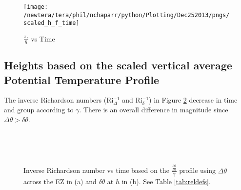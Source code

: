 
\begin{figure}[htbp]
    \centering
    \texttt{[image: /newtera/tera/phil/nchaparr/python/Plotting/Dec252013/pngs/scaled\_h\_f\_time]}
    \caption{$\frac{z_{f}}{h}$ vs Time}
    \label{fig:zfvstime}   %
\end{figure}

\clearpage

\subsection{Heights based on the scaled vertical average Potential Temperature Profile}
\label{subsec:thetari}

The inverse Richardson numbers (\acs{Ri}$_{\Delta}^{-1}$ and \acs{Ri}$_{\delta}^{-1}$) in Figure \ref{fig:invristime} decrease in time and group according to $\gamma$. There is an overall difference in magnitude since $\Delta \theta > \delta \theta$.\\  

\begin{figure}[htbp]

\begin{minipage}[b]{0.5\linewidth}
         
        \\
        \end{minipage}             
\quad
\begin{minipage}[b]{0.5\linewidth}
        \\
       
       \end{minipage}
        \caption[Richardson numbers based on $\frac{\frac{\partial \overline{\theta}}{\partial z}}{\gamma}$]{Inverse Richardson number vs time based on the $\frac{\frac{\partial \overline{\theta}}{\partial z}}{\gamma}$
profile using $\Delta \theta$ across the \acs{EZ} in (a) and $\delta \theta$ at $h$ in (b).  See Table \ref{tab:reldefs}.}
        \label{fig:invristime}
\end{figure}


